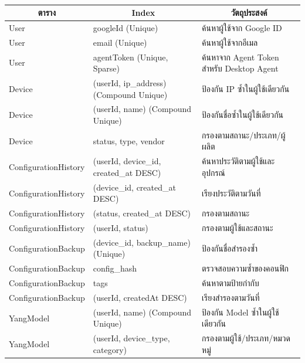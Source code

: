 \begin{table}[H]
    \caption{}
    \label{tab:database-indexes}
    \fontSixTeen 
    \begin{tabularx}{\textwidth}{|l|l|X|} 
        \hline
        \multicolumn{1}{|c|}{\textbf{ตาราง}} & \multicolumn{1}{c|}{\textbf{Index}} & \multicolumn{1}{c|}{\textbf{วัตถุประสงค์}} \\
        \hline
        User & googleId (Unique) & ค้นหาผู้ใช้จาก Google ID \\
        \hline
        User & email (Unique) & ค้นหาผู้ใช้จากอีเมล \\
        \hline
        User & agentToken (Unique, Sparse) & ค้นหาจาก Agent Token สำหรับ Desktop Agent \\
        \hline
        Device & (userId, ip\_address) (Compound Unique) & ป้องกัน IP ซ้ำในผู้ใช้เดียวกัน \\
        \hline
        Device & (userId, name) (Compound Unique) & ป้องกันชื่อซ้ำในผู้ใช้เดียวกัน \\
        \hline
        Device & status, type, vendor & กรองตามสถานะ/ประเภท/ผู้ผลิต \\
        \hline
        ConfigurationHistory & (userId, device\_id, created\_at DESC) & ค้นหาประวัติตามผู้ใช้และอุปกรณ์ \\
        \hline
        ConfigurationHistory & (device\_id, created\_at DESC) & เรียงประวัติตามวันที่ \\
        \hline
        ConfigurationHistory & (status, created\_at DESC) & กรองตามสถานะ \\
        \hline
        ConfigurationHistory & (userId, status) & กรองตามผู้ใช้และสถานะ \\
        \hline
        ConfigurationBackup & (device\_id, backup\_name) (Unique) & ป้องกันชื่อสำรองซ้ำ \\
        \hline
        ConfigurationBackup & config\_hash & ตรวจสอบความซ้ำของคอนฟิก \\
        \hline
        ConfigurationBackup & tags & ค้นหาตามป้ายกำกับ \\
        \hline
        ConfigurationBackup & (userId, createdAt DESC) & เรียงสำรองตามวันที่ \\
        \hline
        YangModel & (userId, name) (Compound Unique) & ป้องกัน Model ซ้ำในผู้ใช้เดียวกัน \\
        \hline
        YangModel & (userId, device\_type, category) & กรองตามผู้ใช้/ประเภท/หมวดหมู่ \\
        \hline

\end{tabularx}
\end{table}
